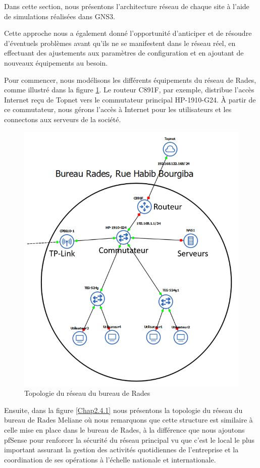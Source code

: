 Dans cette section, nous présentons l'architecture réseau de chaque site à l'aide de simulations réalisées dans GNS3.

Cette approche nous a également donné l'opportunité d'anticiper et de résoudre d'éventuels problèmes avant qu'ils ne se manifestent dans le réseau réel, en effectuant des ajustements aux paramètres de configuration et en ajoutant de nouveaux équipements au besoin.

Pour commencer, nous modélisons les différents équipements du réseau de Rades, comme illustré dans la figure \ref{Chap2.2.0}. Le routeur C891F, par exemple, distribue l'accès Internet reçu de Topnet vers le commutateur principal HP-1910-G24. À partir de ce commutateur, nous gérons l'accès à Internet pour les utilisateurs et les connectons aux serveurs de la société.

\begin{figure}[H]
\centering
\includegraphics[width=16cm]{Images/BRades-Topologie.png}
\caption{Topologie du réseau du bureau de Rades}
\label{Chap2.2.0}
\end{figure}

Ensuite, dans la figure \ref{Chap2.4.1} nous présentons la topologie du réseau du bureau de Rades Meliane où nous remarquons que cette structure est similaire à celle mise en place dans le bureau de Rades, à la différence que nous ajoutons pfSense pour renforcer la sécurité du réseau principal vu que c'est le local le plus important assurant la gestion des activités quotidiennes de l'entreprise et la coordination de ses opérations à l'échelle nationale et internationale.

